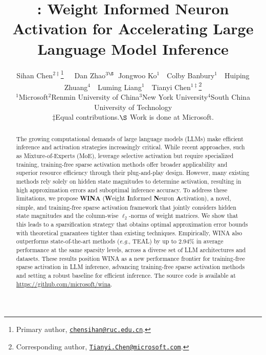 \documentclass{article}
\title{\algacro{}: Weight Informed Neuron Activation for Accelerating Large Language Model Inference}
\author{
Sihan Chen$^{2\ddagger}$\thanks{Primary author, \texttt{\url{chensihan@ruc.edu.cn}}.}\ \ \ Dan Zhao$^{3\S}$\ Jongwoo Ko$^{1}$\ \  Colby Banbury$^{1}$\ \  Huiping Zhuang$^{4}$\ \  Luming Liang$^{1}$\ \  Tianyi Chen$^{1\ddagger}$\thanks{Corresponding author, \texttt{\url{Tianyi.Chen@microsoft.com}}.}\\
$^1$Microsoft\quad $^2$Renmin University of China\quad $^3$New York University\quad $^4$South China University of Technology\\
$\ddagger$Equal contributions.\quad $\S$ Work is done at Microsoft.
}
\newcommand{\eg}{\textit{e.g.}}
\theoremstyle{plain}
\theoremstyle{definition}
\newcommand{\algacro}{WINA{}}
\begin{document}
\maketitle

\begin{abstract}
The growing computational demands of large language models (LLMs) make efficient inference and activation strategies increasingly critical. While recent approaches, such as Mixture-of-Experts (MoE), leverage selective activation but require specialized training, training-free sparse activation methods offer broader applicability and superior resource efficiency through their plug-and-play design. However, many existing methods rely solely on hidden state magnitudes to determine activation,  resulting in high approximation errors and suboptimal inference accuracy. To address these limitations, we propose \textbf{\algacro{}} (\textbf{W}eight \textbf{I}nformed \textbf{N}euron \textbf{A}ctivation), a novel, simple, and training-free sparse activation framework that jointly considers hidden state magnitudes and the column-wise $\ell_2$-norms of weight matrices. We show that this leads to a sparsification strategy that obtains optimal approximation error bounds with theoretical guarantees tighter than existing techniques. Empirically, \algacro{} also outperforms state-of-the-art methods (\eg, TEAL) by up to 2.94\% in average performance at the same sparsity levels, across a diverse set of LLM architectures and datasets. These results position \algacro{} as a new performance frontier for training-free sparse activation in LLM inference, advancing training-free sparse activation methods and setting a robust baseline for efficient inference. The source code is available at \url{https://github.com/microsoft/wina}.
\end{abstract}











\clearpage
\appendix

%





\end{document}
